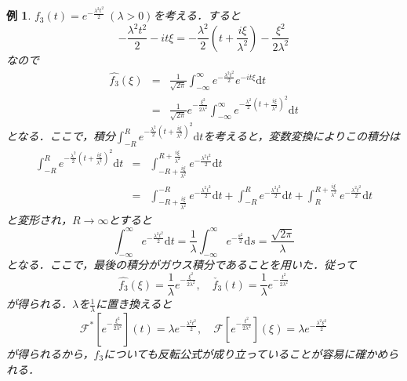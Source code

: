 \documentclass[a4j]{jsbook}
\newtheorem{example}[theorem]{例}
\numberwithin{theorem}{chapter}  %
\begin{document}
\begin{example} 
\label{ex3-3}
\(\displaystyle f_3(t)=e^{-\frac{\lambda^2 t^2}{2}}\ (\lambda>0)\)を考える．すると
\begin{equation*}
    -\frac{\lambda^2 t^2}{2}-it\xi=-\frac{\lambda^2}{2}\left(t+\frac{i\xi}{\lambda^2}\right)-\frac{\xi^2}{2\lambda^2}
\end{equation*}
なので
\begin{eqnarray*}
\hat{f_3}(\xi)&=&\frac{1}{\sqrt{2\pi}}\int_{-\infty}^\infty e^{-\frac{\lambda^2 t^2}{2}}e^{-it\xi}\mathrm{d}t \\
&=&\frac{1}{\sqrt{2\pi}}e^{-\frac{\xi^2}{2\lambda^2}}\int_{-\infty}^\infty e^{-\frac{\lambda^2}{2}\left(t+\frac{i\xi}{\lambda^2}\right)^2}\mathrm{d}t
\end{eqnarray*}
となる．ここで，積分\(\displaystyle\int_{-R}^R e^{-\frac{\lambda^2}{2}\left(t+\frac{i\xi}{\lambda^2}\right)^2}\mathrm{d}t\)を考えると，変数変換によりこの積分は
\begin{eqnarray*}
\int_{-R}^R e^{-\frac{\lambda^2}{2}\left(t+\frac{i\xi}{\lambda^2}\right)^2}\mathrm{d}t&=&\int_{-R+\frac{i\xi}{\lambda^2}}^{R+\frac{i\xi}{\lambda^2}}e^{-\frac{\lambda^2 t^2}{2}}\mathrm{d}t \\
&=&\int_{-R+\frac{i\xi}{\lambda^2}}^{-R}e^{-\frac{\lambda^2 t^2}{2}}\mathrm{d}t+\int_{-R}^R e^{-\frac{\lambda^2 t^2}{2}}\mathrm{d}t+\int_R^{R+\frac{i\xi}{\lambda^2}}e^{-\frac{\lambda^2 t^2}{2}}\mathrm{d}t
\end{eqnarray*}
と変形され，\(R\to\infty\)とすると
\begin{equation*}
    \int_{-\infty}^\infty e^{-\frac{\lambda^2 t^2}{2}}\mathrm{d}t=\frac{1}{\lambda}\int_{-\infty}^\infty e^{-\frac{s^2}{2}}\mathrm{d}s=\frac{\sqrt{2\pi}}{\lambda}
\end{equation*}
となる．ここで，最後の積分がガウス積分であることを用いた．従って
\begin{equation*}
    \hat{f_3}(\xi)=\frac{1}{\lambda}e^{-\frac{\xi^2}{2\lambda^2}},\quad \check{f_3}(t)=\frac{1}{\lambda}e^{-\frac{t^2}{2\lambda^2}}
\end{equation*}
が得られる．\(\lambda\)を\(\displaystyle\frac{1}{\lambda}\)に置き換えると
\begin{equation*}
    \mathcal{F}^*\left[e^{-\frac{\xi^2}{2\lambda^2}}\right](t)=\lambda e^{-\frac{\lambda^2 t^2}{2}},\quad \mathcal{F}\left[e^{-\frac{t^2}{2\lambda^2}}\right](\xi)=\lambda e^{-\frac{\lambda^2\xi^2}{2}}
\end{equation*}
が得られるから，\(f_3\)についても反転公式が成り立っていることが容易に確かめられる．
\end{example}
\end{document}
